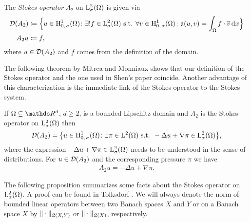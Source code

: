 \begin{defn}
  \label{defn:stokes}
  The \emph{Stokes operator} $A_2$ on $\mathrm{L}_\sigma^2(\Omega)$ is given via
  \begin{align*}
    \mathcal{D}(A_2) &\coloneqq \Big\{ u \in \mathrm{H}_{0,\,\sigma}^1(\Omega) \colon \exists ! f \in \mathrm{L}^2_\sigma(\Omega) \text{ s.t. } \forall v \in \mathrm{H}_{0,\,\sigma}^1(\Omega) \colon \mathfrak{a}(u,v) = \int_\Omega f \cdot \overline v \, {\operatorname{d}\!{x}} \Big\} \\
    A_2 u &\coloneqq f,
  \end{align*}
  where $u \in \mathcal{D}(A_2)$ and $f$ comes from the definition of the domain.
\end{defn}

The following theorem by Mitrea and Monniaux \cite[Thm.\@~4]{mitreaMonniaux} shows that our definition of the Stokes operator and the one used in Shen's paper \cite{Shen2012} coincide. 
Another advantage of this characterization is the immediate link of the Stokes operator to the Stokes system.

\begin{thm}
  \label{thm:stokesOperatorL2}
  If $\Omega \subseteq \R^d$, $d \geq 2$, is a bounded Lipschitz domain and $A_2$ is the Stokes operator on $\mathrm{L}^2_\sigma(\Omega)$ then
  \begin{align*}
    \mathcal{D}(A_2) = \big\{ u \in \mathrm{H}^1_{0,\,\sigma}(\Omega) \colon \exists \pi \in \mathrm{L}^2(\Omega) \text{ s.t. } -\Delta u + \nabla \pi \in \mathrm{L}^2_\sigma(\Omega) \big\},
  \end{align*}
  where the expression $-\Delta u + \nabla \pi \in\mathrm{L}^2_\sigma(\Omega)$ needs to be understood in the sense of distributions.
  For $u \in \mathcal{D}(A_2)$ and the corresponding pressure $\pi$ we have
  \begin{align*}
    A_2 u = -\Delta u + \nabla \pi.
  \end{align*}
\end{thm}

The following proposition summarizes some facts about the Stokes operator on $\mathrm{L}^2_\sigma(\Omega)$. A proof can be found in Tolksdorf \cite[Prop.\@~5.2.5]{tolksdorf}.
We will always denote the norm of bounded linear operators between two Banach spaces $X$ and $Y$ or on a Banach space $X$ by $\| \cdot \|_{\mathfrak{L}(X,Y)}$ or $\|\cdot\|_{\mathfrak{L}(X)}$, respectively.

